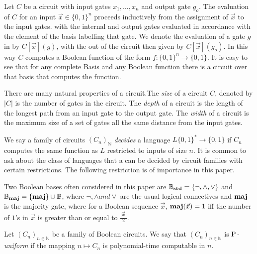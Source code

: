 \documentclass[../paper.tex]{subfiles}
\begin{document}
Let $C$ be a circuit with input gates $x_1, \ldots, x_n$ and output gate $g_o$.
The evaluation of $C$ for an input $\vec{x}\in \{0,1\}^n$ proceeds inductively
from the assignment of $\vec{x}$ to the input gates. with the internal and
output gates evaluated in accordance with the element of the basis labelling
that gate. We denote the evaluation of a gate $g$ in by $C[\vec{x}](g)$, with
the out of the circuit then given by $C[\vec{x}](g_o)$. In this way $C$ computes
a Boolean function of the form $f:\{0,1\}^n \rightarrow \{0,1\}$. It is easy to
see that for any complete Basis and any Boolean function there is a circuit over
that basis that computes the function.


There are many natural properties of a circuit.The \emph{size} of a circuit $C$,
denoted by $\vert C \vert$ is the number of gates in the circuit. The
\emph{depth} of a circuit is the length of the longest path from an input gate
to the output gate. The \emph{width} of a circuit is the maximum size of a set
of gates all the same distance from the input gates.

We say a family of circuits $(C_n)_{\mathbb{N}}$ \emph{decides} a language $L
\{0,1\}^{*} \rightarrow \{0,1\}$ if $C_n$ computes the same function as $L$
restricted to inputs of size $n$. It is common to ask about the class of
languages that a can be decided by circuit families with certain restrictions.
The following restriction is of importance in this paper.

Two Boolean bases often considered in this paper are $\mathbb{B}_{\text{\textbf{std}}} = \{
\neg , \wedge , \lor \}$ and $\mathbb{B}_{\text{\textbf{maj}}} = \{ \text{\textbf{maj}} \} \cup \mathbb{B}$,
where $\neg, \wedge and \lor$ are the usual logical connectives and $\text{\textbf{maj}}$ is
the majority gate, where for a Boolean sequence $\vec{x}$, $\text{\textbf{maj}}(\vec{x}) = 1$
iff the number of $1$'s in $\vec{x}$ is greater than or equal to
$\frac{\vert\vec{x}\vert}{2}$.


\begin{definition}
  Let $(C_n)_{n \in \mathbb{N}}$ be a family of Boolean circuits. We say that
  $(C_n)_{n \in \mathbb{N}}$ is \emph{$\mathrm{P}$-uniform} if the mapping $n \mapsto
  C_n$ is polynomial-time computable in $n$.
\end{definition}
\end{document}
